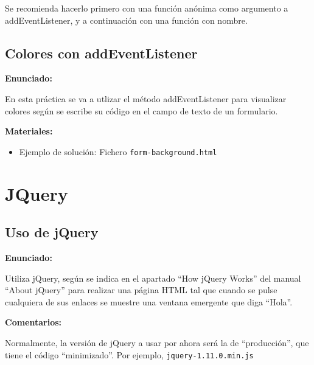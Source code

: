 Se recomienda hacerlo primero con una función anónima como argumento a addEventListener, y a continuación con una función con nombre.


\subsection{Colores con addEventListener}
\label{subsec:eje-js-addeventlistener-colores}

\textbf{Enunciado:}

En esta práctica se va a utlizar el método addEventListener para visualizar colores según se escribe su código en el campo de texto de un formulario.

\textbf{Materiales:}

\begin{itemize}
\item Ejemplo de solución: Fichero \verb|form-background.html|
\end{itemize}


\section{JQuery}

\subsection{Uso de jQuery}
\label{subsec:eje-jquery-uso}

\textbf{Enunciado:}

Utiliza jQuery, según se indica en el apartado ``How jQuery Works'' del manual ``About jQuery'' para realizar una página HTML tal que cuando se pulse cualquiera de sus enlaces se muestre una ventana emergente que diga ``Hola''. 

\textbf{Comentarios:}

Normalmente, la versión de jQuery a usar por ahora será la de ``producción'', que tiene el código ``minimizado''. Por ejemplo, \verb|jquery-1.11.0.min.js|


